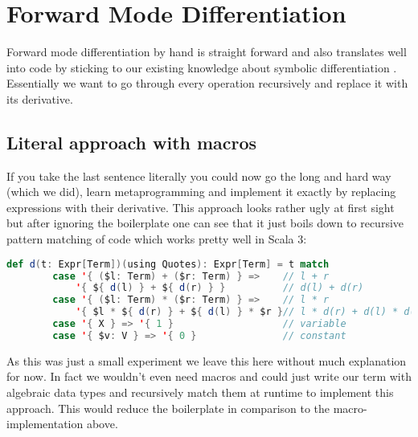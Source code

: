 \section{Forward Mode Differentiation}

Forward mode differentiation by hand is straight forward and also translates well into code by sticking to our existing knowledge about symbolic differentiation . Essentially we want to go through every operation recursively and replace it with its derivative.


\subsection{Literal approach with macros}

If you take the last sentence literally you could now go the long and hard way (which we did), learn metaprogramming and implement it exactly by replacing expressions with their derivative. This approach looks rather ugly at first sight but after ignoring the boilerplate one can see that it just boils down to recursive pattern matching of code which works pretty well in Scala 3:
\begin{lstlisting}[language=scala]
    def d(t: Expr[Term])(using Quotes): Expr[Term] = t match
        case '{ ($l: Term) + ($r: Term) } =>    // l + r
            '{ ${ d(l) } + ${ d(r) } }          // d(l) + d(r)
        case '{ ($l: Term) * ($r: Term) } =>    // l * r
            '{ $l * ${ d(r) } + ${ d(l) } * $r }// l * d(r) + d(l) * d(r)
        case '{ X } => '{ 1 }                   // variable
        case '{ $v: V } => '{ 0 }               // constant
\end{lstlisting}
As this was just a small experiment we leave this here without much explanation for now. In fact we wouldn't even need macros and could just write our term with algebraic data types and recursively match them at runtime to implement this approach. This would reduce the boilerplate in comparison to the macro-implementation above.


